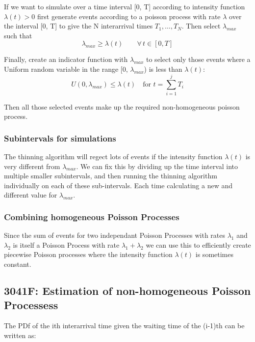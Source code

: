 \documentclass[12pt]{article}
\begin{document}
    If we want to simulate over a time interval [0, T] according to intensity function 
    \(\lambda(t) > 0\) first generate events according to a poisson process with rate \(\lambda\)
    over the interval [0, T] to give the N interarrival times \(T_1, \dots, T_N\).\newline
    Then select \(\lambda_{max}\) such that 
    \begin{equation*}
        \lambda_{max} \ge \lambda(t) \qquad \forall \, t \in [0, T]
    \end{equation*}

    Finally, create an indicator function with \(\lambda_{max}\) to select only those events where
    a Uniform random variable in the range [0, \(\lambda_{max}\)) is less than \(\lambda(t)\): 
    \begin{equation*}
        U(0, \lambda_{max}) \le \lambda(t) \quad \text{for } t = \sum_{i=1}^{j} T_i
    \end{equation*}

    Then all those selected events make up the required non-homogeneous poisson process.
    \subsubsection{Subintervals for simulations}
    The thinning algorithm will regect lots of events if the intensity function \(\lambda(t)\) 
    is very different from \(\lambda_{max}\). We can fix this by dividing up the time interval
    into multiple smaller subintervals, and then running the thinning algorithm individually on
    each of these sub-intervals. Each time calculating a new and different value for 
    \(\lambda_{max}\).
    \subsubsection{Combining homogeneous Poisson Processes}
    Since the sum of events for two independant Poisson Processes with rates 
    \(\lambda_1\) and \(\lambda_2\) is itself a Poisson Process with rate \(\lambda_1 + \lambda_2\)
    we can use this to efficiently create piecewise Poisson processes where the 
    intensity function \(\lambda(t)\) is sometimes constant.
    \subsection{3041F: Estimation of non-homogeneous Poisson Processess}
    The PDf of the ith interarrival time given the waiting time of the (i-1)th can be written as:
\end{document}
